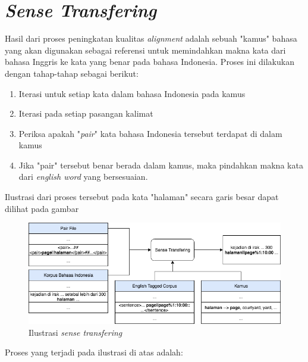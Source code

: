 \section{\textit{Sense Transfering}}
Hasil dari proses peningkatan kualitas \textit{alignment} adalah sebuah "kamus" bahasa yang akan digunakan sebagai referensi untuk memindahkan makna kata dari bahasa Inggris ke kata yang benar pada bahasa Indonesia. Proses ini dilakukan dengan tahap-tahap sebagai berikut:

\begin{enumerate}
	\item Iterasi untuk setiap kata dalam bahasa Indonesia pada kamus
	\item Iterasi pada setiap pasangan kalimat
	\item Periksa apakah "\textit{pair}" kata bahasa Indonesia tersebut terdapat di dalam kamus
	\item Jika "pair" tersebut benar berada dalam kamus, maka pindahkan makna kata dari \textit{english word} yang bersesuaian.
\end{enumerate}

Ilustrasi dari proses tersebut pada kata "halaman" secara garis besar dapat dilihat pada gambar 


\begin{figure}
	\centering
	\includegraphics[width=1\linewidth]{adit_pics/sense-transfering}
	\caption{Ilustrasi \textit{sense transfering}}
	\label{fig:ilustrasi-sense-transfering}
\end{figure}

Proses yang terjadi pada ilustrasi di atas adalah:

